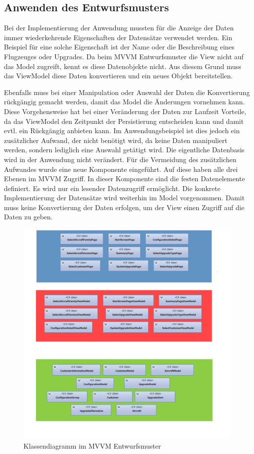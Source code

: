 \subsection{Anwenden des Entwurfsmusters}
Bei der Implementierung der Anwendung mussten für die Anzeige der Daten immer wiederkehrende Eigenschaften der Datensätze verwendet werden. Ein Beispiel für eine solche Eigenschaft ist der Name oder die Beschreibung eines Flugzeuges oder Upgrades. Da beim MVVM Entwurfsmuster die View nicht auf das Model zugreift, kennt es diese Datenobjekte nicht. Aus diesem Grund muss das ViewModel diese Daten konvertieren und ein neues Objekt bereitstellen. 

Ebenfalls muss bei einer Manipulation oder Auswahl der Daten die Konvertierung rückgängig gemacht werden, damit das Model die Änderungen vornehmen kann. Diese Vorgehensweise hat bei einer Veränderung der Daten zur Laufzeit Vorteile, da das ViewModel den Zeitpunkt der Persistierung entscheiden kann und damit evtl. ein Rückgängig anbieten kann. Im Anwendungsbeispiel ist dies jedoch ein zusätzlicher Aufwand, der nicht benötigt wird, da keine Daten manipuliert werden, sondern lediglich eine Auswahl getätigt wird. Die eigentliche Datenbasis wird in der Anwendung nicht verändert.
Für die Vermeidung des zusätzlichen Aufwandes wurde eine neue Komponente eingeführt. Auf diese haben alle drei Ebenen im MVVM Zugriff. In dieser Komponente sind die festen Datenelemente definiert. Es wird nur ein lesender Datenzugriff ermöglicht. Die konkrete Implementierung der Datensätze wird weiterhin im Model vorgenommen. Damit muss keine Konvertierung der Daten erfolgen, um der View einen Zugriff auf die Daten zu geben. \par 
\begin{figure}
\centering
\includegraphics[width=\hsize]{images/uml_diagramm}
\caption{Klassendiagramm im MVVM Entwurfsmuster}
\label{mvvmApp}
\end{figure}
